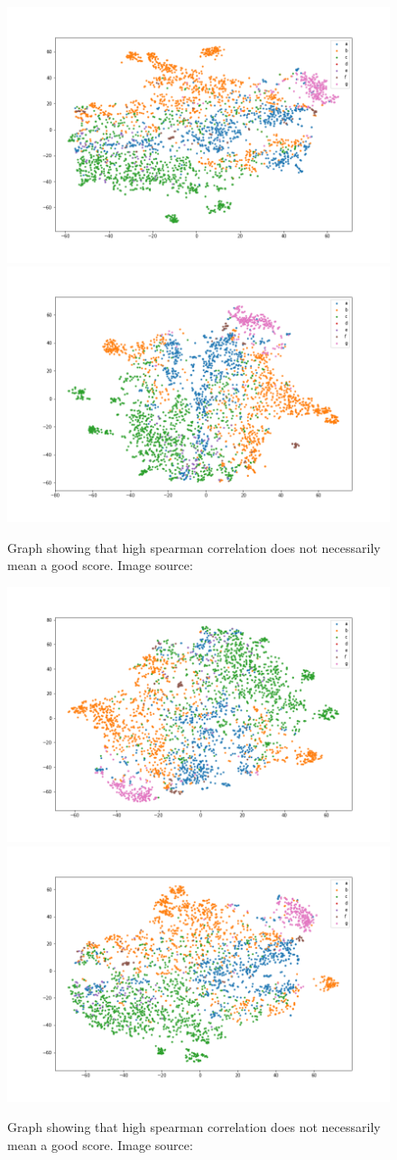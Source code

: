 \begin{figure}[!ht]
  \centering
  \includegraphics[width=0.4\linewidth]{latex/imgs/tsne_1_layer_no_schedule_512_final.png}
  \includegraphics[width=0.4\linewidth]{latex/imgs/tsne_1_layer_no_schedule_512_minloss.png}
  \caption{Graph showing that high spearman correlation does not necessarily mean a good score. Image source:\cite{spearman}}
\end{figure}
\begin{figure}[!ht]
  \centering
  \includegraphics[width=0.4\linewidth]{latex/imgs/tsne_1_layer_with_schedule_512_final.png}
  \includegraphics[width=0.4\linewidth]{latex/imgs/tsne_1_layer_with_schedule_512_minloss.png}
  \caption{Graph showing that high spearman correlation does not necessarily mean a good score. Image source:\cite{spearman}}
\end{figure}
